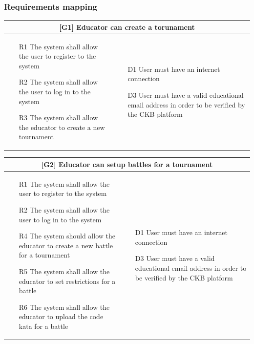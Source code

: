 \subsubsection{Requirements mapping}
\begin{tabular}{|p{6cm}|p{6cm}|}
    \hline
    \multicolumn{2}{|c|}{[G1] Educator can create a torunament} \\
    \hline
    \begin{itemize}
        \item [R1] The system shall allow the user to register to the system
        \item [R2] The system shall allow the user to log in to the system
        \item [R3] The system shall allow the educator to create a new tournament
    \end{itemize}
    &
    \begin{itemize}
        \item [D1] User must have an internet connection
        \item [D3] User must have a valid educational email address in order to be verified by the CKB platform
    \end{itemize}
    \\
    \hline
\end{tabular}

\begin{tabular}{|p{6cm}|p{6cm}|}
    \hline
    \multicolumn{2}{|c|}{[G2] Educator can setup battles for a tournament} \\
    \hline
    \begin{itemize}
        \item [R1] The system shall allow the user to register to the system
        \item [R2] The system shall allow the user to log in to the system
        \item [R4] The system should allow the educator to create a new battle for a tournament
        \item [R5] The system shall allow the educator to set restrictions for a battle
        \item  [R6] The system shall allow the educator to upload the code kata for a battle
    \end{itemize}
    &
    \begin{itemize}
        \item [D1] User must have an internet connection
        \item [D3] User must have a valid educational email address in order to be verified by the CKB platform
    \end{itemize}
    \\
    \hline
\end{tabular}

